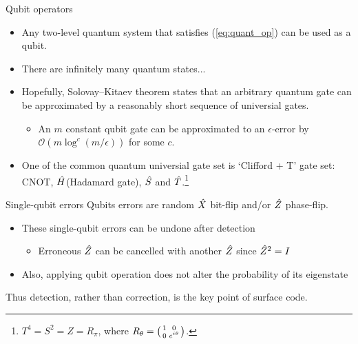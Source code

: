 \documentclass{beamer}
\begin{document}
    \begin{frame}{Qubit operators}
        \begin{itemize}
            \item Any two-level quantum system that satisfies (\ref{eq:quant_op}) can be used as a qubit.
            \item There are infinitely many quantum states...
            \item Hopefully, Solovay–Kitaev theorem states that an arbitrary quantum gate can be approximated by a reasonably short sequence of universial gates.
            \begin{itemize}
                \item An $m$ constant qubit gate can be approximated to an $ \epsilon $-error by $ \mathcal{O}(m \log^c(m/\epsilon)) $ for some $ c $.
            \end{itemize}
            \item One of the common quantum universial gate set is `Clifford + T' gate set: CNOT, $ \shat{H} $(Hadamard gate), $ \shat{S} $ and $ \shat{T} $.\footnote{$ T^4 = S^2 = Z = R_\pi$, where $ R_\theta = \begin{psmallmatrix}
            1 & 0 \\
            0 & e^{i\theta}
            \end{psmallmatrix} $.}
        \end{itemize}
    \end{frame}
    

    \begin{frame}{Single-qubit errors}
        Qubits errors are random $ \shat{X} $ bit-flip and/or $ \shat{Z} $ phase-flip.
        \begin{itemize}
            \item These single-qubit errors can be undone after detection
            \begin{itemize}
                \item Erroneous $ \shat{Z} $ can be cancelled with another $ \shat{Z} $ since $ \shat{Z}^2 = I $
            \end{itemize}
            \item Also, applying qubit operation does not alter the probability of its eigenstate
        \end{itemize}
        Thus detection, rather than correction, is the key point of surface code.
    \end{frame}
    
\end{document}
